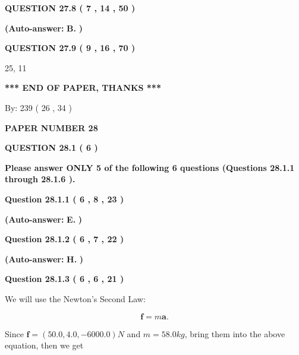 \documentclass[12pt]{article}
\begin{document}
  
  
{\textbf{\large{QUESTION
27.8 
 (           7 ,          14 ,          50 )
}}}
 
 
{\textbf{(Auto-answer:}}
{\textbf{\large{
B.}}}
{\textbf{)}}
 
 
  
  
{\textbf{\large{QUESTION
27.9 
 (           9 ,          16 ,          70 )
}}}

25,  %
11
 
   
   
   
   
\vspace{1.0in} 
{\textbf{\large{ *** END OF PAPER, THANKS *** }}} 
   
   
\hspace{1.0in} By: 
         239 (          26 ,           34 )
   
   
   
   
\newpage 
\setcounter{page}{ 
    28001 } 
   
   
 {\textbf{ \Large{ PAPER NUMBER           28  }}}
   
   
   
   
  
\vspace{0.2in}
  
{\textbf{\Large{QUESTION
28.1 
 (           6 )
}}}
  
  
{\textbf{\Large{Please answer ONLY  %
           5  %
 of the following  %
           6  %
 questions (Questions  %
28.1.1 %
 through  %
28.1.6 %
 ). }}}
   
   
  
  
{\textbf{\large{Question
28.1.1 
 (           6 ,           8 ,          23 )
}}}
 
 
{\textbf{(Auto-answer:}}
{\textbf{\large{
E.}}}
{\textbf{)}}
 
 
  
  
{\textbf{\large{Question
28.1.2 
 (           6 ,           7 ,          22 )
}}}
 
 
{\textbf{(Auto-answer:}}
{\textbf{\large{
H.}}}
{\textbf{)}}
 
 
  
  
{\textbf{\large{Question
28.1.3 
 (           6 ,           6 ,          21 )
}}}

We will use the Newton's Second Law:
 
\[
\mathbf{f}=m\mathbf{a}.
\]
 
Since $\mathbf{f}=( %
50.0,  %
4.0,  %
-6000.0 )N$
and $m= %
58.0 kg$, bring them into the above equation, then we get
 
\end{document}
